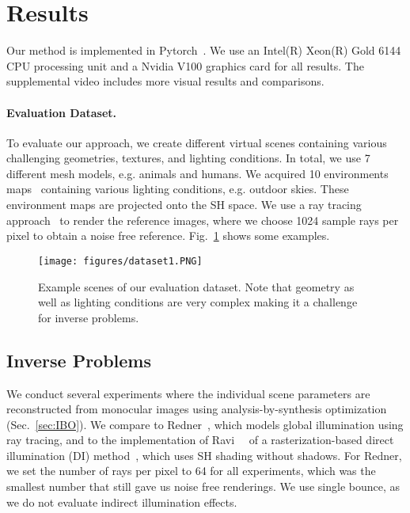 %
%
\section{Results}
%
\label{sec:results}
%
Our method is implemented in Pytorch~\cite{NEURIPS2019_9015}.
%
We use an Intel(R) Xeon(R) Gold 6144 CPU processing unit and a Nvidia V100 graphics card for all results.
%
The supplemental video includes more visual results and comparisons.
%
%
\paragraph{Evaluation Dataset.}
%
To evaluate our approach, we create different virtual scenes containing various challenging geometries, textures, and lighting conditions.
%
In total, we use 7 different mesh models, e.g. animals and humans.
%
We acquired 10 environments maps~\cite{laval_hdr} containing various lighting conditions, e.g. outdoor skies.
%
These environment maps are projected onto the SH space.
%
We use a ray tracing approach~\cite{li2018differentiable} to render the reference images, where we choose 1024 sample rays per pixel to obtain a noise free reference.
%
Fig.~\ref{fig:scenes} shows some examples.
%
%
\begin{figure}
	\centering
	\texttt{[image: figures/dataset1.PNG]} 
	\caption
	{
		Example scenes of our evaluation dataset.
		Note that geometry as well as lighting conditions are very complex making it a challenge for inverse problems.
	}
	\label{fig:scenes}
\end{figure}
%
%
%
\subsection{Inverse Problems}
%
We conduct several experiments where the individual scene parameters are reconstructed from monocular images using analysis-by-synthesis optimization (Sec.~\ref{sec:IBO}). 
%
We compare to Redner~\cite{li2018differentiable}, which models global illumination using ray tracing, and to the implementation of Ravi~\etal~\cite{ravi2020pytorch3d} of a rasterization-based direct illumination (DI) method~\cite{10.1145/383259.383317}, which uses SH shading without shadows.
%
For Redner, we set the number of rays per pixel to 64 for all experiments, which was the smallest number that still gave us noise free renderings.
%
We use single bounce, as we do not evaluate indirect illumination effects.

